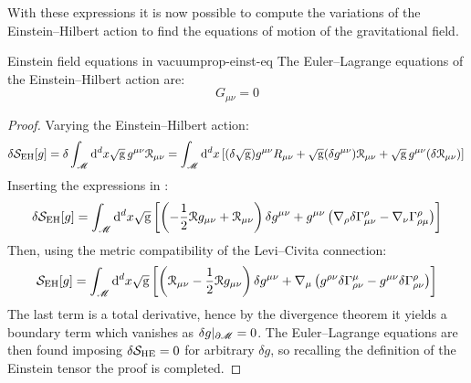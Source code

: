With these expressions it is now possible to compute the variations of the Einstein--Hilbert action to find the equations of motion of the gravitational field.

\begin{proposition}{Einstein field equations in vacuum}{prop-einst-eq}
  The Euler--Lagrange equations of the Einstein--Hilbert action are:
  \begin{equation}
    G_{\mu \nu} = 0
    \label{eq:vacuum-feq}
  \end{equation}
\end{proposition}

\begin{proofbox}
  \begin{proof}
    Varying the Einstein--Hilbert action:
    \begin{equation*}
      \delta \mathcal{S}_\text{EH}[g] = \delta \int_\mathscr{M} \mathrm{d}^d x \sqrt{\mathrm{g}}\, g^{\mu \nu} \EuScript{R}_{\mu \nu} = \int_\mathscr{M} \mathrm{d}^d x \left[ (\delta \sqrt{\mathrm{g}}) g^{\mu \nu} R_{\mu \nu} + \sqrt{\mathrm{g}} (\delta g^{\mu \nu}) \EuScript{R}_{\mu \nu} + \sqrt{\mathrm{g}}\, g^{\mu \nu} (\delta \EuScript{R}_{\mu \nu}) \right] \\
    \end{equation*}
    Inserting the expressions in :
    \begin{equation*}
      \delta \mathcal{S}_\text{EH}[g] = \int_\mathscr{M} \mathrm{d}^d x \sqrt{\mathrm{g}} \left[ \left( - \frac{1}{2} \EuScript{R} g_{\mu \nu} + \EuScript{R}_{\mu \nu} \right) \delta g^{\mu \nu} + g^{\mu \nu} \left( \nabla_\rho \delta \Gamma^\rho_{\mu \nu} - \nabla_\nu \Gamma^\rho_{\rho \mu} \right) \right]
    \end{equation*}
    Then, using the metric compatibility of the Levi--Civita connection:
    \begin{equation*}
      \mathcal{S}_\text{EH}[g] = \int_\mathscr{M} \mathrm{d}^d x \sqrt{\mathrm{g}} \left[ \left( \EuScript{R}_{\mu \nu} - \frac{1}{2} \EuScript{R} g_{\mu \nu} \right) \delta g^{\mu \nu} + \nabla_\mu \left( g^{\rho \nu} \delta \Gamma^\mu_{\rho \nu} - g^{\mu \nu} \delta \Gamma^\rho_{\rho \nu} \right) \right]
    \end{equation*}
    The last term is a total derivative, hence by the divergence theorem  it yields a boundary term which vanishes as $ \delta g \vert_{\partial \mathscr{M}} = 0 $. The Euler--Lagrange equations are then found imposing $ \delta \mathcal{S}_\text{HE} = 0 $ for arbitrary $ \delta g $, so recalling the definition of the Einstein tensor  the proof is completed.
  \end{proof}
\end{proofbox}


